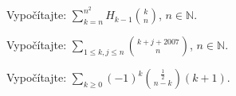 \pr Vypočítajte: $\sum_{k=n}^{n^2} H_{k-1}{k \choose n}$, $n\in\mathbb{N}$.

\pr Vypočítajte: $\sum_{1\leq k,j\leq n}{k+j+2007 \choose n}$, $n\in\mathbb{N}$.

\pr Vypočítajte: $\sum_{k\geq0}\left(-1\right)^k{\frac12 \choose n-k}\left(k+1\right)$.
